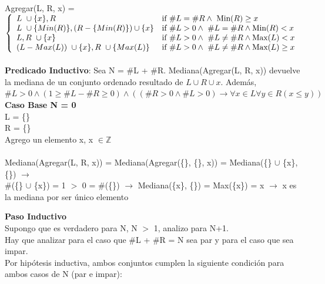 \documentclass{article}
\theoremstyle{definition}
\theoremstyle{remark}
\begin{document}
    Agregar(L, R, x) = $\fourpartdef { L  \ \cup \{x\}, R} 
                                    {\#L = \#R   \wedge \ \text{Min}(R) \geq x} 
                                    { L  \ \cup \{Min(R)\}, (R - \{Min(R)\}) \cup \{x\}}
                                    { \#L > 0  \wedge \ \#L = \#R \wedge \text{Min}(R) < x}
                                    {L, R \ \cup \{x\}}
                                    {\#L > 0  \wedge \ \#L \neq \#R \wedge \text{Max}(L) < x}
                                    {(L - Max(L)) \ \cup \{x\}, R \ \cup \{Max(L)\} }
                                    {\#L > 0  \wedge \ \#L \neq \#R \wedge \text{Max}(L) \geq x}$\\
      \\
          
\textbf{Predicado Inductivo}: Sea N = \#L + \#R. Mediana(Agregar(L, R, x)) devuelve la mediana de un conjunto ordenado resultado  de ${L} \cup {R} \cup {x}$. Además, $\#L > 0  \wedge  (1 \geq \#L - \#R \geq 0) \wedge ((\#R > 0 \wedge \#L > 0) \rightarrow \forall x \in L \forall y \in R (x \leq y) )$ \\ 
    


\textbf{Caso Base N = 0} \\

L = \{\} \\  

R = \{\} \\ 

Agrego un elemento x, x $\in \mathds{Z}$ \\ \\

Mediana(Agregar(L, R, x)) = 
Mediana(Agregar(\{\}, \{\}, x)) =
Mediana(\{\} $\cup$ \{x\}, \{\}) $\rightarrow$ \\ 
\#(\{\} $\cup$ \{x\}) = 1 $>$ 0 = \#(\{\}) $\rightarrow$
Mediana(\{x\}, \{\}) = Max(\{x\}) = x $\rightarrow$ x es la mediana por ser único elemento

\textbf{Paso Inductivo} \\

Supongo que es verdadero para N, N $>$ 1, analizo para N+1.\\

Hay que analizar para el caso que \#L + \#R = N sea par y para el caso que sea impar. \\

Por hipótesis inductiva, ambos conjuntos cumplen la siguiente condición para ambos casos de N (par e impar): 
\end{document}
